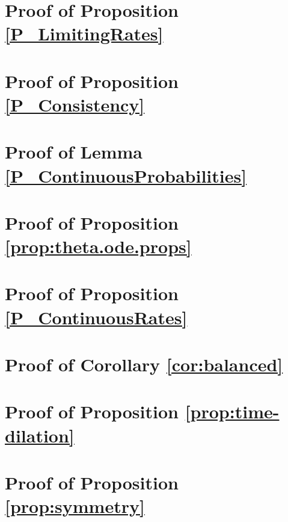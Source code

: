 \section{Proof of Proposition \ref{P_LimitingRates}}



\section{Proof of Proposition \ref{P_Consistency}}



\section{Proof of Lemma \ref{P_ContinuousProbabilities}}



\section{Proof of Proposition \ref{prop:theta.ode.props}}



\section{Proof of Proposition \ref{P_ContinuousRates}}



\section{Proof of Corollary \ref{cor:balanced}}



\section{Proof of Proposition \ref{prop:time-dilation}}



\section{Proof of Proposition \ref{prop:symmetry}}

